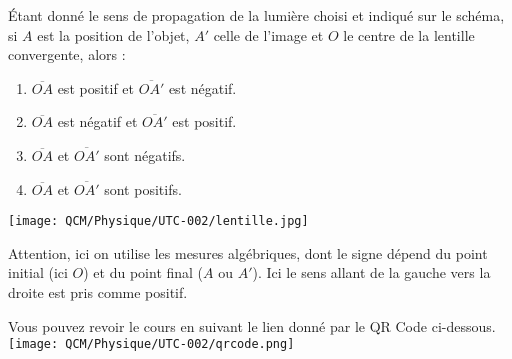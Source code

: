 \documentclass[avery5371]{flashcards}
\begin{document}
\begin{flashcard}{
\justify

\begin{minipage}[c]{0.6\linewidth}
    Étant donné le sens de propagation de la lumière choisi et indiqué sur le schéma, si $A$ est la position de l'objet, $A'$ celle de l'image et $O$ le centre de la lentille convergente, alors :
    \begin{enumerate}
        \item $\overline{OA}$ est positif et $\overline{OA'}$ est négatif.
        \item $\overline{OA}$ est négatif et $\overline{OA'}$ est positif.
        \item $\overline{OA}$ et $\overline{OA'}$ sont négatifs.
    	\item $\overline{OA}$ et $\overline{OA'}$ sont positifs.
    \end{enumerate}
\end{minipage}%
\hfill
\begin{minipage}[c]{0.3\linewidth}
    \strut\vspace*{-\baselineskip}\newline
    \texttt{[image: QCM/Physique/UTC-002/lentille.jpg]}
\end{minipage}
}
\justify
Attention, ici on utilise les mesures algébriques, dont le signe dépend du point initial (ici $O$) et du point final ($A$ ou $A'$). Ici le sens allant de la gauche vers la droite est pris comme positif.

Vous pouvez revoir le cours en suivant le lien donné par le QR Code ci-dessous.
\newline
\texttt{[image: QCM/Physique/UTC-002/qrcode.png]}

\end{flashcard}
\end{document}
